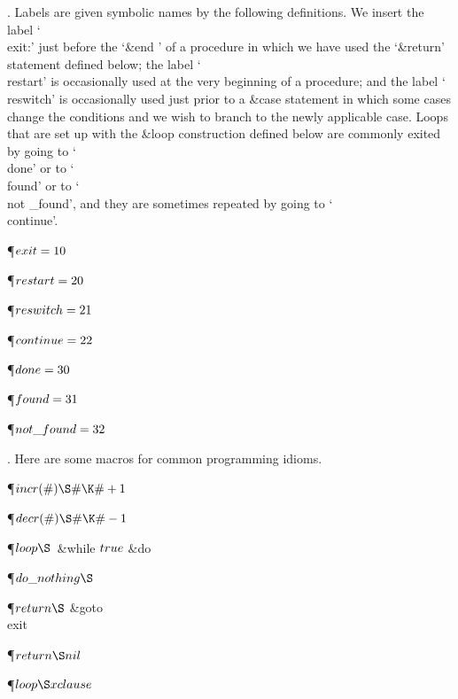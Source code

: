 . Labels are given symbolic names by the following definitions. We insert
the label `\\{exit}:' just before the `\ignorespaces  \&{end} \unskip' of a
procedure in which we have used the `\&{return}' statement defined below;
the label `\\{restart}' is occasionally used at the very beginning of a
procedure; and the label `\\{reswitch}' is occasionally used just prior to
a \&{case} statement in which some cases change the conditions and we wish to
branch to the newly applicable case.
Loops that are set up with the \&{loop} construction defined below are
commonly exited by going to `\\{done}' or to `\\{found}' or to `\\{not%
\_found}',
and they are sometimes repeated by going to `\\{continue}'.

\Y\P\D {}$\\{exit}=10$\par
\P\D {}$\\{restart}=20$\par
\P\D {}$\\{reswitch}=21$\par
\P\D {}$\\{continue}=22$\par
\P\D {}$\\{done}=30$\par
\P\D {}$\\{found}=31$\par
\P\D {}$\\{not\_found}=32$\par
\fi

. Here are some macros for common programming idioms.

\Y\P\D {}$\\{incr}(\#)\S\#\K\#+1$\par
\P\D {}$\\{decr}(\#)\S\#\K\#-1$\par
\P\D {}$\\{loop}\S$\ \&{while} $\\{true}$ \1\&{do}\ \par
\P\D {}$\\{do\_nothing}\S$\par
\P\D {}$\\{return}\S$\1\5
\&{goto} \\{exit}\2\par
\P\F {}$\\{return}\S\\{nil}$\par
\P\F {}$\\{loop}\S\\{xclause}$\par
\fi

